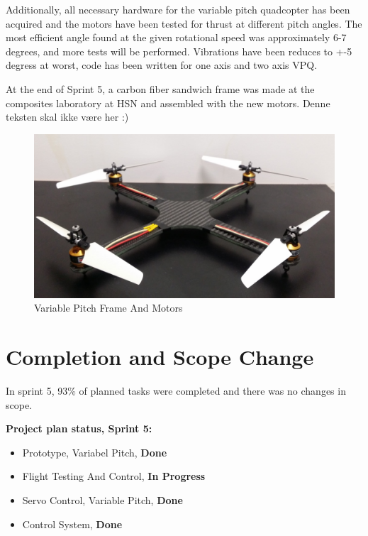 Additionally, all necessary hardware for the variable pitch quadcopter has been acquired and the motors have been tested for thrust at different pitch angles. The most efficient angle found at the given rotational speed was approximately 6-7 degrees, and more tests will be performed. Vibrations have been reduces to +-5 degress at worst, code has been written for one axis and two axis VPQ.  \bigskip

At the end of Sprint 5, a carbon fiber sandwich frame was made at the composites laboratory at HSN and assembled with the new motors. Denne teksten skal ikke være her :)

\begin{figure}[H]
    \centering
         \includegraphics[width = 1\textwidth]{VAPIQ-PICTURES/VariablePitchFrame_Motor}
      \caption{Variable Pitch Frame And Motors }
    \label{fig:vpqframe}
\end{figure} 

\clearpage
\section{Completion and Scope Change}

In sprint 5, 93\% of planned tasks were completed and there was no changes in scope. 

\textbf{Project plan status, Sprint 5:}

\begin{itemize}
        \item Prototype, Variabel Pitch, \textbf{Done}
        \item Flight Testing And Control, \textbf{In Progress}
        \item Servo Control, Variable Pitch, \textbf{Done}
        \item Control System, \textbf{Done}
    \end{itemize}


